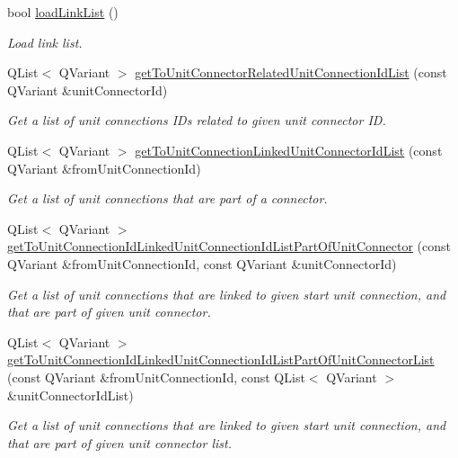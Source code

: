 \begin{DoxyCompactItemize}
bool \hyperlink{classmdt_tt_logical_test_cable_a51b5f332775a29c4dbc05c929713293b}{load\-Link\-List} ()
\begin{DoxyCompactList}\small\item\em Load link list. \end{DoxyCompactList}\item 
Q\-List$<$ Q\-Variant $>$ \hyperlink{classmdt_tt_logical_test_cable_a639ca1a216ea8db9d7cfb8c7c241f1c1}{get\-To\-Unit\-Connector\-Related\-Unit\-Connection\-Id\-List} (const Q\-Variant \&unit\-Connector\-Id)
\begin{DoxyCompactList}\small\item\em Get a list of unit connections I\-Ds related to given unit connector I\-D. \end{DoxyCompactList}\item 
Q\-List$<$ Q\-Variant $>$ \hyperlink{classmdt_tt_logical_test_cable_a03201438460408a4cf770712ce1145eb}{get\-To\-Unit\-Connection\-Linked\-Unit\-Connector\-Id\-List} (const Q\-Variant \&from\-Unit\-Connection\-Id)
\begin{DoxyCompactList}\small\item\em Get a list of unit connections that are part of a connector. \end{DoxyCompactList}\item 
Q\-List$<$ Q\-Variant $>$ \hyperlink{classmdt_tt_logical_test_cable_aaf184091f44f37797a1c3283d6bce46c}{get\-To\-Unit\-Connection\-Id\-Linked\-Unit\-Connection\-Id\-List\-Part\-Of\-Unit\-Connector} (const Q\-Variant \&from\-Unit\-Connection\-Id, const Q\-Variant \&unit\-Connector\-Id)
\begin{DoxyCompactList}\small\item\em Get a list of unit connections that are linked to given start unit connection, and that are part of given unit connector. \end{DoxyCompactList}\item 
Q\-List$<$ Q\-Variant $>$ \hyperlink{classmdt_tt_logical_test_cable_a121c20a2286eee68eb2e1c2690bc89fa}{get\-To\-Unit\-Connection\-Id\-Linked\-Unit\-Connection\-Id\-List\-Part\-Of\-Unit\-Connector\-List} (const Q\-Variant \&from\-Unit\-Connection\-Id, const Q\-List$<$ Q\-Variant $>$ \&unit\-Connector\-Id\-List)
\begin{DoxyCompactList}\small\item\em Get a list of unit connections that are linked to given start unit connection, and that are part of given unit connector list. \end{DoxyCompactList}\item 

\end{DoxyCompactItemize}
